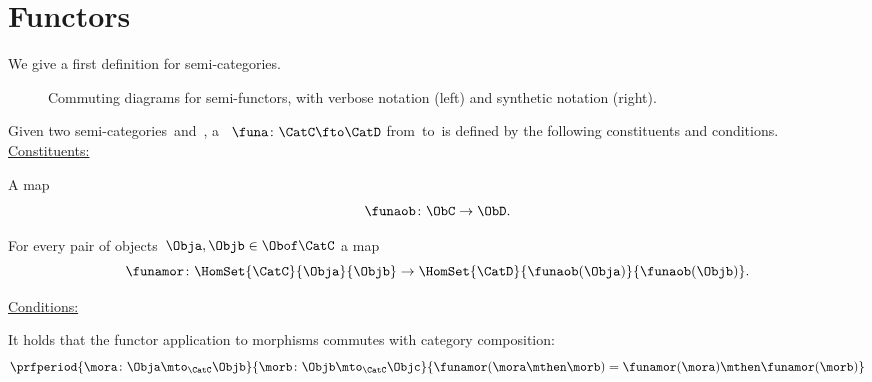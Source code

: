 \section{Functors}

We give a first definition for semi-categories.


\begin{figure*}
    \begin{ctdefinitionshade}
    \end{ctdefinitionshade}
    \caption{Commuting diagrams for semi-functors, with verbose notation (left) and synthetic notation (right).}
\end{figure*}

\begin{ctdefinition}
    \label{def:semi-functor}
    Given two semi-categories~\CatC and~\CatD, a \emph{}~$\funa\colon \CatC\fto \CatD$ from~\CatC to~\CatD is defined by the following constituents and conditions. \\
    \underline{Constituents:}
    \begin{compactenum}
        [i)]
        \item A map
              \begin{equation}
                  \funaob\colon \ObC \to \ObD.
              \end{equation}
        \item For every pair of objects~$\Obja, \Objb\in \Obof\CatC$ a map
              \begin{equation}
                  \funamor\colon \HomSet{\CatC}{\Obja}{\Objb} \to \HomSet{\CatD}{\funaob(\Obja)}{\funaob(\Objb)}.
              \end{equation}
    \end{compactenum}
    \underline{Conditions:}
    \begin{compactenum}
        \item It holds that the functor application to morphisms commutes with category composition:
              \begin{equation}
                \prfperiod{
                      \mora\colon \Obja \mto_{\CatC} \Objb
                  }{
                      \morb\colon \Objb \mto_{\CatC} \Objc
                  }{
                      \funamor(\mora \mthen \morb)=\funamor(\mora)\mthen \funamor(\morb)
                  }
              \end{equation}
    \end{compactenum}
\end{ctdefinition}

